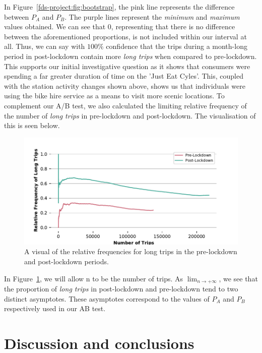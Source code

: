 \documentclass[11pt,a4paper]{article}
\begin{document}
In Figure~\ref{fds-project:fig:bootstrap}, the pink line represents the difference between $P_A$ and $P_B$. The purple lines represent the \emph{minimum} and \emph{maximum} values obtained. We can see that $0$, representing that there is no difference between the aforementioned proportions, is not included within our interval at all. Thus, we can say with $100\%$ confidence that the trips during a month-long period in post-lockdown contain more \emph{long trips} when compared to pre-lockdown. This supports our initial investigative question as it shows that consumers were spending a far greater duration of time on the 'Just Eat Cyles'. This, coupled with the station activity changes shown above, shows us that individuals were using the bike hire service as a means to visit more scenic locations. To complement our A/B test, we also calculated the limiting relative frequency of the number of \emph{long trips} in pre-lockdown and post-lockdown. The visualisation of this is seen below.
\begin{figure}[ht]
  \includegraphics{relative_frequencies.pdf}
  \caption{A visual of the relative frequencies for long trips in the pre-lockdown and post-lockdown periods.}
  \label{fds-project:fig:relativeFrequency}
\end{figure}

In Figure~\ref{fds-project:fig:relativeFrequency}, we will allow n to be the number of trips. As $\lim_{n \to +\infty}$, we see that the proportion of \emph{long trips} in post-lockdown and pre-lockdown tend to two distinct asymptotes. These asymptotes correspond to the values of $P_A$ and $P_B$ respectively used in our AB test. 

\section{Discussion and conclusions}
\end{document}
